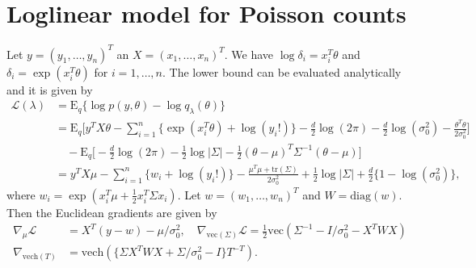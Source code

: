 \documentclass{statsoc}
\newcommand\E{{\text{E}}}
\newcommand\mL{{\mathcal{L}}}
\newcommand\diag{{\text{diag}}}
\newcommand\tr{\text{tr}}
\newcommand{\vc}{\text{vec}}
\newcommand{\vech}{\text{vech}}
\begin{document}
\section{Loglinear model for Poisson counts}  \label{S2}
Let $y = (y_1, \dots, y_n)^T$ an $X = (x_1, \dots, x_n)^T$. We have $\log \delta_i = x_i^T \theta$ and $\delta_i = \exp(x_i^T \theta)$ for $i=1, \dots, n$. The lower bound can be evaluated analytically and it is given by 
\[
\begin{aligned}
\mL(\lambda) &= \E_q \{\log p(y, \theta) - \log q_\lambda(\theta)\} \\
&= \E_q \bigg[  y^T X \theta - \sum_{i=1}^n \{\exp(x_i^T \theta)  + \log(y_i!)\} - \frac{d}{2} \log(2\pi) - \frac{d}{2} \log(\sigma_0^2)  - \frac{\theta^T \theta}{2\sigma_0^2} \bigg] \\
& \quad - \E_q \bigg[ -\frac{d}{2} \log(2\pi) - \frac{1}{2} \log|\Sigma|- \frac{1}{2} (\theta - \mu)^T \Sigma^{-1} (\theta - \mu) \bigg] \\
&= y^T X \mu - \sum_{i=1}^n \{w_i + \log(y_i!) \} - \frac{\mu^T \mu + \tr(\Sigma)}{2\sigma_0^2} + \frac{1}{2} \log|\Sigma| + \frac{d}{2} \{1 -  \log(\sigma_0^2)\},
\end{aligned}
\]
where $w_i =  \exp (x_i^T \mu + \frac{1}{2} x_i^T \Sigma x_i )$. Let $w=(w_1, \dots, w_n)^T$ and $W = \diag(w)$. Then the Euclidean gradients are given by 
\[
\begin{aligned}
\nabla_\mu \mL &= X^T (y - w)  - \mu/\sigma_0^2, \quad
\nabla_{\vc(\Sigma)} \mL = \tfrac{1}{2} \vc ( \Sigma^{-1}  - I/\sigma_0^2 - X^T W X ) \\
\nabla_{\vech(T)} &= \vech ( \{ \Sigma X^T W X  + \Sigma/\sigma_0^2 - I \} T^{-T} ).
\end{aligned}
\]
\end{document}

